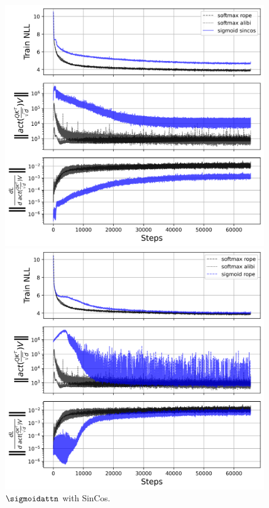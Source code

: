 \begin{figure}[htbp]
    \centering
    \begin{minipage}{0.48\textwidth}
        \centering
        \includegraphics[width=\textwidth]{figures/attn_norm_seed1000001_softmax_rope_vs_softmax_alibi_vs_sigmoid_sincos.png}    
        \captionsetup{justification=centering}
        \caption{$\sigmoidattn$ with SinCos.}
        \label{fig:rope_vs_sincos}
    \end{minipage}\hfill
    \begin{minipage}{0.48\textwidth}
        \centering        
        \includegraphics[width=\textwidth]{figures/attn_norm_seed1000001_softmax_rope_vs_softmax_alibi_vs_sigmoid_rope.png}

\end{minipage}
\end{figure}
